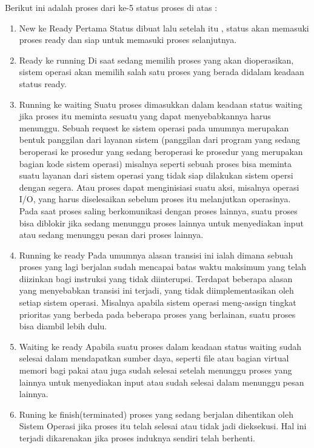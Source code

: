 	Berikut ini adalah proses dari ke-5 status proses di atas :
	\begin{enumerate}
		\item New ke Ready
		Pertama Status dibuat lalu setelah itu , status akan memasuki proses ready dan siap untuk memasuki proses selanjutnya.
		\item Ready ke running
		Di saat sedang memilih proses yang akan dioperasikan, sistem operasi akan memilih salah satu proses yang berada didalam keadaan status ready.
		\item Running ke waiting
		Suatu proses dimasukkan dalam keadaan status waiting jika proses itu meminta sesuatu yang dapat menyebabkannya harus menunggu. Sebuah request ke sistem operasi pada umumnya merupakan bentuk panggilan dari layanan sistem (panggilan dari program yang sedang beroperasi ke prosedur yang sedang beroperasi ke prosedur yang merupakan bagian kode sistem operasi) misalnya seperti sebuah proses bisa meminta suatu layanan dari sistem operasi yang tidak siap dilakukan sistem opersi dengan segera. Atau proses dapat menginisiasi suatu aksi, misalnya operasi I/O, yang harus diselesaikan sebelum proses itu melanjutkan operasinya. Pada saat proses saling berkomunikasi dengan proses lainnya, suatu proses bisa diblokir jika sedang menunggu proses lainnya untuk menyediakan input atau sedang menunggu pesan dari proses lainnya.
		\item Running ke ready
		Pada umumnya alasan transisi ini ialah dimana sebuah proses yang lagi berjalan sudah mencapai batas waktu maksimum yang telah diizinkan bagi instruksi yang tidak diinterupsi. Terdapat beberapa alasan yang menyebabkan transisi ini terjadi, yang tidak diimplementasikan oleh setiap sistem operasi. Misalnya apabila sistem operasi meng-assign tingkat prioritas yang berbeda pada beberapa proses yang berlainan, suatu proses bisa diambil lebih dulu.
		\item Waiting ke ready
		Apabila suatu proses dalam keadaan status waiting sudah selesai dalam mendapatkan sumber daya, seperti file atau bagian virtual memori bagi pakai atau juga sudah selesai setelah menunggu proses yang lainnya untuk menyediakan input atau sudah selesai dalam menunggu pesan lainnya.
		\item Runing ke finish(terminated)
		proses yang sedang berjalan dihentikan oleh Sistem Operasi jika proses itu telah selesai atau tidak jadi dieksekusi. Hal ini terjadi dikarenakan jika proses induknya sendiri telah berhenti.
	\end{enumerate}
	
